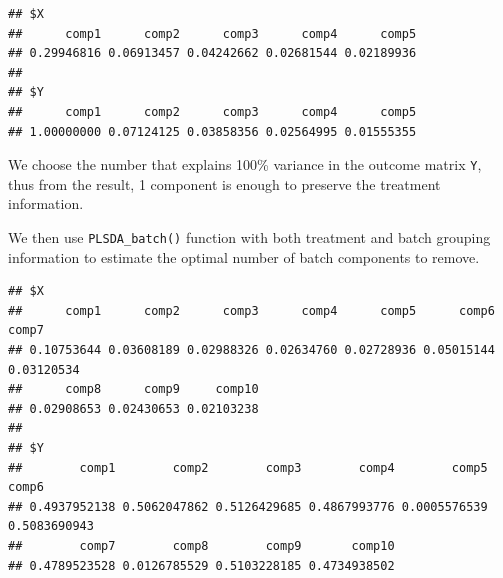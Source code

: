 \documentclass[
]{book}
\newenvironment{Shaded}{\begin{snugshade}}{\end{snugshade}}
\newcommand{\AttributeTok}[1]{\textcolor[rgb]{0.77,0.63,0.00}{#1}}
\newcommand{\CommentTok}[1]{\textcolor[rgb]{0.56,0.35,0.01}{\textit{#1}}}
\newcommand{\DecValTok}[1]{\textcolor[rgb]{0.00,0.00,0.81}{#1}}
\newcommand{\FunctionTok}[1]{\textcolor[rgb]{0.00,0.00,0.00}{#1}}
\newcommand{\NormalTok}[1]{#1}
\newcommand{\OtherTok}[1]{\textcolor[rgb]{0.56,0.35,0.01}{#1}}
\newcommand{\SpecialCharTok}[1]{\textcolor[rgb]{0.00,0.00,0.00}{#1}}
\begin{document}
\begin{Shaded}
\end{Shaded}

\begin{verbatim}
## $X
##      comp1      comp2      comp3      comp4      comp5 
## 0.29946816 0.06913457 0.04242662 0.02681544 0.02189936 
## 
## $Y
##      comp1      comp2      comp3      comp4      comp5 
## 1.00000000 0.07124125 0.03858356 0.02564995 0.01555355
\end{verbatim}

We choose the number that explains 100\% variance in the outcome matrix \texttt{Y}, thus from the result, 1 component is enough to preserve the treatment information.

We then use \texttt{PLSDA\_batch()} function with both treatment and batch grouping information to estimate the optimal number of batch components to remove.

\begin{Shaded}
\end{Shaded}

\begin{verbatim}
## $X
##      comp1      comp2      comp3      comp4      comp5      comp6      comp7 
## 0.10753644 0.03608189 0.02988326 0.02634760 0.02728936 0.05015144 0.03120534 
##      comp8      comp9     comp10 
## 0.02908653 0.02430653 0.02103238 
## 
## $Y
##        comp1        comp2        comp3        comp4        comp5        comp6 
## 0.4937952138 0.5062047862 0.5126429685 0.4867993776 0.0005576539 0.5083690943 
##        comp7        comp8        comp9       comp10 
## 0.4789523528 0.0126785529 0.5103228185 0.4734938502
\end{verbatim}
\end{document}
